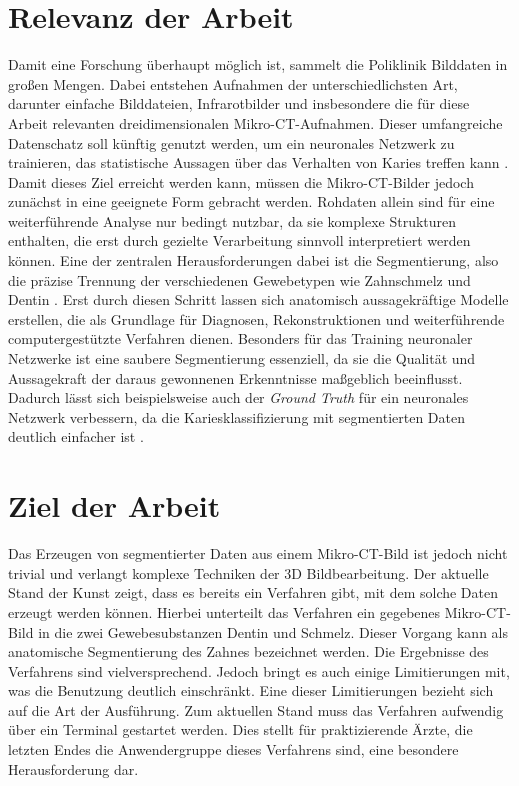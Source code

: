 \section{Relevanz der Arbeit}
\label{sec:relevanz_der_arbeit} Damit eine Forschung überhaupt möglich ist,
sammelt die Poliklinik Bilddaten in großen Mengen. Dabei entstehen Aufnahmen der
unterschiedlichsten Art, darunter einfache Bilddateien, Infrarotbilder und insbesondere
die für diese Arbeit relevanten dreidimensionalen Mikro-\ac{CT}-Aufnahmen. Dieser
umfangreiche Datenschatz soll künftig genutzt werden, um ein neuronales Netzwerk
zu trainieren, das statistische Aussagen über das Verhalten von Karies treffen kann
\citep[vgl.][S.~1]{walter2025projekt}. Damit dieses Ziel erreicht werden kann,
müssen die Mikro-\ac{CT}-Bilder jedoch zunächst in eine geeignete Form gebracht werden.
Rohdaten allein sind für eine weiterführende Analyse nur bedingt nutzbar, da sie
komplexe Strukturen enthalten, die erst durch gezielte Verarbeitung sinnvoll
interpretiert werden können. Eine der zentralen Herausforderungen dabei ist die Segmentierung,
also die präzise Trennung der verschiedenen Gewebetypen wie Zahnschmelz und
Dentin \citep[vgl.][S.~359]{lehmann2013bildverarbeitung}. Erst durch diesen
Schritt lassen sich anatomisch aussagekräftige Modelle erstellen, die als Grundlage
für Diagnosen, Rekonstruktionen und weiterführende computergestützte Verfahren
dienen. Besonders für das Training neuronaler Netzwerke ist eine saubere Segmentierung
essenziell, da sie die Qualität und Aussagekraft der daraus gewonnenen
Erkenntnisse maßgeblich beeinflusst. Dadurch lässt sich beispielsweise auch der \textit{Ground
Truth} für ein neuronales Netzwerk verbessern, da die Kariesklassifizierung mit segmentierten
Daten deutlich einfacher ist \citep[vgl.][S.~1]{walter2025projekt}.

\section{Ziel der Arbeit}
\label{sec:ziel_der_arbeit} Das Erzeugen von segmentierter Daten aus einem Mikro-\ac{CT}-Bild
ist jedoch nicht trivial und verlangt komplexe Techniken der \ac{3D}
Bildbearbeitung. Der aktuelle Stand der Kunst zeigt, dass es bereits ein
Verfahren gibt, mit dem solche Daten erzeugt werden können. Hierbei unterteilt
das Verfahren ein gegebenes Mikro-\ac{CT}-Bild in die zwei Gewebesubstanzen Dentin
und Schmelz. Dieser Vorgang kann als anatomische Segmentierung des Zahnes
bezeichnet werden. Die Ergebnisse des Verfahrens sind vielversprechend. Jedoch
bringt es auch einige Limitierungen mit, was die Benutzung deutlich einschränkt.
Eine dieser Limitierungen bezieht sich auf die Art der Ausführung. Zum aktuellen
Stand muss das Verfahren aufwendig über ein Terminal gestartet werden. Dies
stellt für praktizierende Ärzte, die letzten Endes die Anwendergruppe dieses Verfahrens
sind, eine besondere Herausforderung dar.

